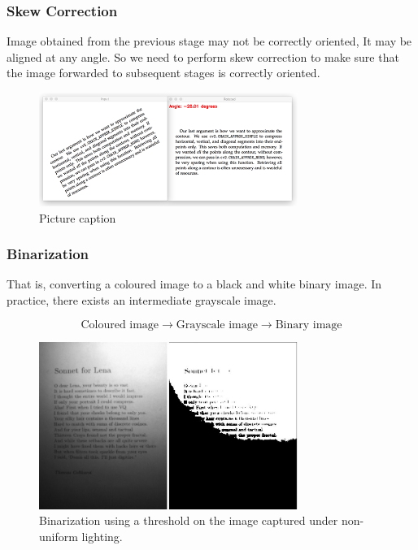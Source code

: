 \documentclass[12pt]{article}
\theoremstyle{mytheoremstyle}
\theoremstyle{mytheoremstyle}
\theoremstyle{myproblemstyle}
\begin{document}
    \subsubsection{Skew Correction}
      Image obtained from the previous stage may not be correctly oriented, It may be aligned at any angle. So we need to perform skew correction to make sure that the image forwarded to subsequent stages is correctly oriented.
      
      \begin{figure}[H]
        \includegraphics[width=0.75\textwidth, center]{images/2.png}
        \caption{Picture caption}
      \end{figure}
    
    \subsubsection{Binarization}
      That is, converting a coloured image to a black and white binary image. In practice, there exists an intermediate grayscale image.
      
      \begin{equation*}
        \text{Coloured image} \rightarrow \text{Grayscale image} \rightarrow \text{Binary image}
      \end{equation*}
      
      \begin{figure}[H]
        \centering
        \includegraphics[width=0.75\textwidth]{images/1.jpeg}
        \caption{Binarization using a threshold on the image captured under non-uniform lighting.}
      \end{figure}
\end{document}

